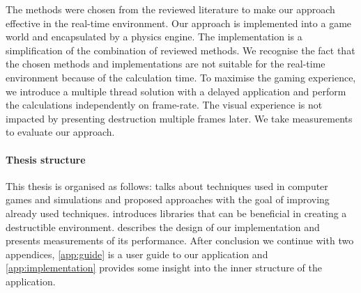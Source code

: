 The methods were chosen from the reviewed literature to make our approach effective in the real-time environment. Our approach is implemented into a game world and encapsulated by a physics engine. The implementation is a simplification of the combination of reviewed methods. We recognise the fact that the chosen methods and implementations are not suitable for the real-time environment because of the calculation time. To maximise the gaming experience, we introduce a multiple thread solution with a delayed application and perform the calculations independently on frame-rate. The visual experience is not impacted by presenting destruction multiple frames later. We take measurements to evaluate our approach.

\paragraph{Thesis structure}
This thesis is organised as follows:  talks about techniques used in computer games and simulations and proposed approaches with the goal of improving already used techniques.  introduces libraries that can be beneficial in creating a destructible environment.  describes the design of our implementation and presents measurements of its performance. After conclusion we continue with two appendices, \cref{app:guide} is a user guide to our application and \cref{app:implementation} provides some insight into the inner structure of the application. 

